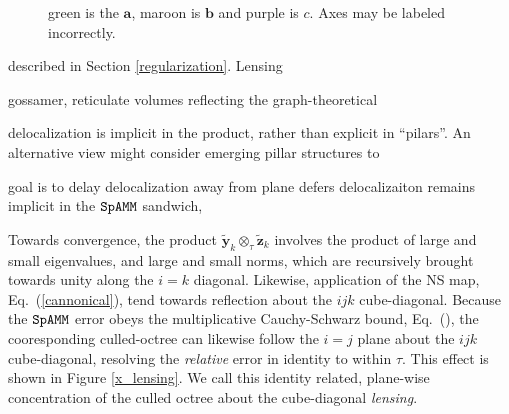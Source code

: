 \documentclass[letterpaper,twocolumn,amsmath,amsfont,amssymb,english,aps,jcp,preprintnumbers,groupaddress,nofootinbib,tightenlines,floatfix]{revtex4}
\newcommand{\mat}[1]{\boldsymbol{#1}}
\newcommand{\ot}{  {\scriptstyle \otimes}_{ \tau } }
\theoremstyle{plain}
\theoremstyle{remark}
\theoremstyle{plain}
\begin{document}
 

\begin{figure}[h] \label{Lensing2}
\caption{green is the $\mat{a}$, maroon is $\mat{b}$ and purple is $c$. Axes may be labeled incorrectly. }
\end{figure}




described in Section \ref{regularization}.  Lensing 




gossamer, reticulate volumes reflecting the graph-theoretical 

delocalization is implicit in the product, rather than explicit in ``pilars''.  An alternative
view might consider emerging pillar structures to 

goal is to delay delocalization away from plane defers delocalizaiton remains implicit in the $\tt SpAMM$ sandwich, 


Towards convergence,  
the product $\widetilde{\mat{y}}_k \ot \widetilde{\mat{z}}_k$ involves the product of large and small eigenvalues, and large and small norms, 
which are recursively brought towards unity along the $i=k$ diagonal.  Likewise, application of the NS map, Eq.~(\ref{cannonical}),  tend towards 
reflection about the $ijk$ cube-diagonal.   Because the $\tt SpAMM$ error obeys the multiplicative Cauchy-Schwarz bound, Eq.~(),  the 
cooresponding culled-octree can likewise follow the $i=j$ plane about the $ijk$ cube-diagonal, resolving the {\em relative} error in identity to within $\tau$.    This effect is shown in Figure \ref{x_lensing}.   
We call this identity related,  plane-wise concentration of the culled octree  about the cube-diagonal {\em lensing}.  
\end{document}
